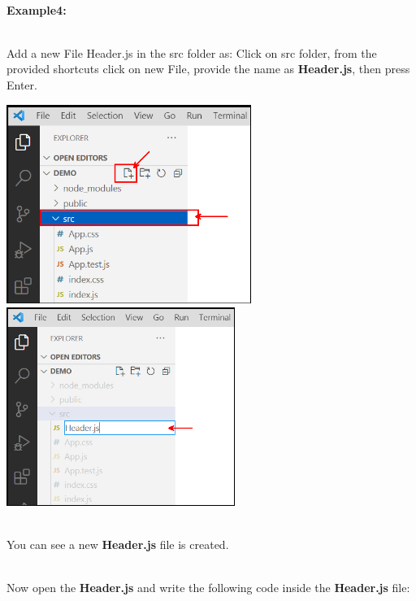 \documentclass{article}
\begin{document}
\noindent 

\noindent 
\newpage
\noindent\\
 \textbf{Example4:}

\noindent\\
 Add a new File Header.js in the src folder as: Click on src folder, from the provided shortcuts click on new File, provide the name as \textbf{Header.js}, then press Enter.

\noindent 

\begin{center}
	\noindent \includegraphics*[width=3.14in, height=2.55in]{IMG-07-18}  \includegraphics*[width=2.93in, height=2.54in]{IMG-07-19}
\end{center}

\noindent 

\noindent\\
 You can see a new \textbf{Header.js} file is created.

\noindent 

\noindent 

\noindent 

\noindent 

\noindent\\
 Now open the \textbf{Header.js} and write the following code inside the \textbf{Header.js} file:
\end{document}
